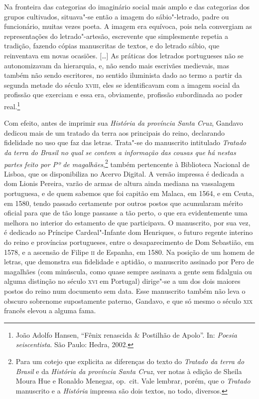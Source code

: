 \begin{hedraquote}
Na fronteira das categorias do imaginário social mais amplo e das
categorias dos grupos cultivados, situava"-se então a imagem do
sábio"-letrado, padre ou funcionário, muitas vezes poeta. A imagem era
equívoca, pois nela convergiam as representações do letrado"-artesão,
escrevente que simplesmente repetia a tradição, fazendo cópias
manuscritas de textos, e do letrado sábio, que reinventava em novas
ocasiões. [\ldots{}] As práticas dos letrados portugueses não se
autonomizavam da hierarquia, e, não sendo mais escrivães medievais, mas
também não sendo escritores, no sentido iluminista dado ao termo a
partir da segunda metade do século \textsc{xviii}, eles se identificavam com a
imagem social da profissão que exerciam e essa era, obviamente,
profissão subordinada ao poder real.\footnote{ João Adolfo Hansen,
``Fênix renascida \& Postilhão de Apolo''. In: \textit{Poesia seiscentista}. São Paulo: Hedra, 2002.} 
\end{hedraquote}

Com efeito, antes de imprimir sua \textit{História da província Santa Cruz},
Gandavo dedicou mais de um tratado da terra aos principais do reino,
declarando fidelidade no uso que faz das letras. Trata"-se do manuscrito
intitulado \textit{Tratado da terra do Brasil no qual se contem a informação
das cousas que há nestas partes feito por Pº de magalhães},\footnote{ Para 
um cotejo que explicita as diferenças do texto
do \textit{Tratado da terra do Brasil} e da \textit{História da província Santa Cruz},
ver notas à edição de Sheila Moura Hue e Ronaldo Menegaz, op.~cit. Vale
lembrar, porém, que o \textit{Tratado} manuscrito e a \textit{História} impressa são
dois textos, no todo, diversos.} também pertencente à Biblioteca
Nacional de Lisboa, que os disponibiliza no Acervo Digital. A versão
impressa é dedicada a dom Lionis Pereira, varão de armas de altura
ainda mediana na vassalagem portuguesa, e de quem sabemos que foi
capitão em Malaca, em 1564, e em Ceuta, em 1580, tendo passado
certamente por outros postos que acumularam mérito oficial para que de
tão longe passasse a tão perto, o que era evidentemente uma melhora no
interior do estamento de que participava. O manuscrito, por sua vez, é
dedicado ao Príncipe Cardeal"-Infante dom Henriques, o futuro regente
interino do reino e províncias portugueses, entre o desaparecimento de
Dom Sebastião, em 1578, e a ascensão de Filipe \textsc{ii} de Espanha, em 1580.
Na posição de um homem de letras, que demonstra sua fidelidade e
aptidão, o manuscrito assinado por Pero de magalhães (com minúscula,
como quase sempre assinava a gente sem fidalguia ou alguma distinção no
século \textsc{xvi} em Portugal) dirige"-se a um dos dois maiores postos do reino
num documento sem data. Esse manuscrito também não leva o obscuro
sobrenome supostamente paterno, Gandavo, e que só mesmo o século \textsc{xix}
francês elevou a alguma fama.

